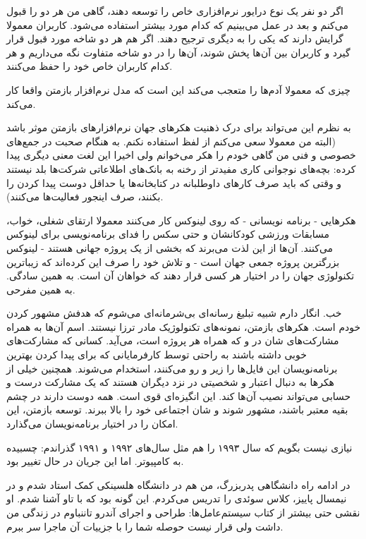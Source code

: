 اگر دو نفر یک نوع درایور نرم‌افزاری خاص را توسعه دهند، گاهی من هر دو را
قبول می‌کنم و بعد در عمل می‌بینیم که کدام مورد بیشتر استفاده
می‌شود. کاربران معمولا گرایش دارند که یکی را به دیگری ترجیح دهند. اگر
هم هر دو شاخه مورد قبول قرار گیرد و کاربران بین آن‌ها پخش شوند، آن‌ها را
در دو شاخه متفاوت نگه می‌داریم و هر کدام کاربران خاص خود را حفظ می‌کنند.

چیزی که معمولا آدم‌ها را متعجب می‌کند این است که مدل نرم‌افزار بازمتن
واقعا کار می‌کند.

به نظرم این می‌تواند برای درک ذهنیت هکرهای جهان نرم‌افزارهای بازمتن موثر
باشد (البته من معمولا سعی می‌کنم از لفظ  استفاده نکنم. به
هنگام صحبت در جمع‌های خصوصی و فنی من گاهی خودم را هکر می‌خوانم ولی اخیرا
این لغت معنی دیگری پیدا کرده: بچه‌های نوجوانی کاری مفیدتر از رخنه به
بانک‌های اطلاعاتی شرکت‌ها بلد نیستند و وقتی که باید صرف کارهای داوطلبانه
در کتابخانه‌ها یا حداقل دوست پیدا کردن را بکنند، صرف اینجور فعالیت‌ها
می‌کنند).

هکرهایی - برنامه نویسانی - که روی لینوکس کار می‌کنند معمولا ارتقای
شغلی، خواب، مسابقات ورزشی کودکانشان و حتی سکس را فدای برنامه‌نویسی برای
لینوکس می‌کنند. آن‌ها از این لذت می‌برند که بخشی از یک پروژه جهانی هستند
- لینوکس بزرگترین پروژه جمعی جهان است - و تلاش خود را صرف این کرده‌اند
که زیباترین تکنولوژی جهان را در اختیار هر کسی قرار دهند که خواهان آن
است. به همین سادگی. به همین مفرحی.

خب. انگار دارم شبیه تبلیغ رسانه‌ای بی‌شرمانه‌ای می‌شوم که هدفش مشهور کردن
خودم است. هکرهای بازمتن، نمونه‌های تکنولوژیک مادر ترزا نیستند. اسم آن‌ها
به همراه مشارکت‌های شان در  و  که همراه هر پروژه است، می‌آید. کسانی که مشارکت‌های خوبی داشته
باشند به راحتی توسط کارفرمایانی که برای پیدا کردن بهترین برنامه‌نویسان
این فایل‌ها را زیر و رو می‌کنند، استخدام می‌شوند. همچنین خیلی از هکرها به
دنبال اعتبار و‌ شخصیتی در نزد دیگران هستند که یک مشارکت درست و حسابی
می‌تواند نصیب آن‌ها کند. این انگیزه‌ای قوی است. همه دوست دارند در چشم
بقیه معتبر باشند، مشهور شوند و شان اجتماعی خود را بالا ببرند. توسعه
بازمتن، این امکان را در اختیار برنامه‌نویسان می‌گذارد.

نیازی نیست بگویم که سال ۱۹۹۳ را هم مثل سال‌های ۱۹۹۲ و ۱۹۹۱ گذراندم:
چسبیده به کامپیوتر. اما این جریان در حال تغییر بود.

در ادامه راه دانشگاهی پدربزرگ، من هم در دانشگاه هلسینکی کمک استاد شدم
و در نیمسال پاییز، کلاس سوئدی  را
تدریس می‌کردم. این گونه بود که با تاو آشنا شدم. او نقشی حتی بیشتر از
کتاب سیستم‌عامل‌ها: طراحی و اجرای آندرو تاننباوم در زندگی من داشت ولی
قرار نیست حوصله شما را با جزییات آن ماجرا سر ببرم.

